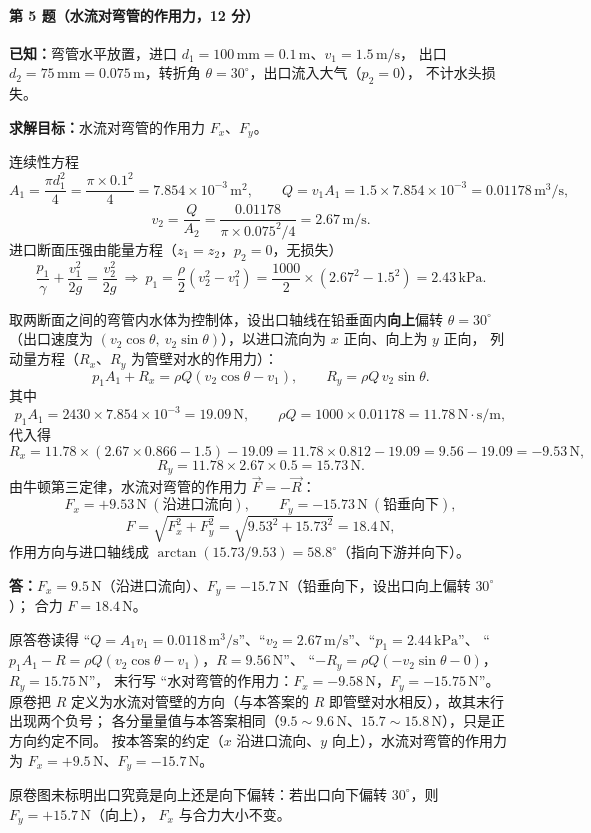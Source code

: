 \paragraph{第 5 题（水流对弯管的作用力，12 分）}
\begin{jie}
\textbf{已知：}弯管水平放置，进口 $d_1=100\,\mathrm{mm}=0.1\,\mathrm{m}$、$v_1=1.5\,\mathrm{m/s}$，
出口 $d_2=75\,\mathrm{mm}=0.075\,\mathrm{m}$，转折角 $\theta=30^{\circ}$，出口流入大气（$p_2=0$），
不计水头损失。

\textbf{求解目标：}水流对弯管的作用力 $F_x$、$F_y$。

连续性方程
\[
A_1=\frac{\pi d_1^{2}}{4}=\frac{\pi\times0.1^{2}}{4}=7.854\times10^{-3}\,\mathrm{m^{2}},
\qquad
Q=v_1A_1=1.5\times7.854\times10^{-3}=0.01178\,\mathrm{m^{3}/s},
\]
\[
v_2=\frac{Q}{A_2}=\frac{0.01178}{\pi\times0.075^{2}/4}=2.67\,\mathrm{m/s}.
\]
进口断面压强由能量方程（$z_1=z_2$，$p_2=0$，无损失）
\[
\frac{p_1}{\gamma}+\frac{v_1^{2}}{2g}=\frac{v_2^{2}}{2g}
\ \Longrightarrow\
p_1=\frac{\rho}{2}\left(v_2^{2}-v_1^{2}\right)
=\frac{1000}{2}\times(2.67^{2}-1.5^{2})=2.43\,\mathrm{kPa}.
\]

取两断面之间的弯管内水体为控制体，设出口轴线在铅垂面内\textbf{向上}偏转 $\theta=30^{\circ}$
（出口速度为 $(v_2\cos\theta,\ v_2\sin\theta)$），以进口流向为 $x$ 正向、向上为 $y$ 正向，
列动量方程（$R_x$、$R_y$ 为管壁对水的作用力）：
\[
p_1A_1+R_x=\rho Q\left(v_2\cos\theta-v_1\right),
\qquad
R_y=\rho Q\,v_2\sin\theta .
\]
其中
\[
p_1A_1=2430\times7.854\times10^{-3}=19.09\,\mathrm{N},
\qquad
\rho Q=1000\times0.01178=11.78\,\mathrm{N\cdot s/m},
\]
代入得
\[
R_x=11.78\times(2.67\times0.866-1.5)-19.09
=11.78\times0.812-19.09=9.56-19.09=-9.53\,\mathrm{N},
\]
\[
R_y=11.78\times2.67\times0.5=15.73\,\mathrm{N}.
\]
由牛顿第三定律，水流对弯管的作用力 $\vec F=-\vec R$：
\[
F_x=+9.53\,\mathrm{N}\ (\text{沿进口流向}),\qquad
F_y=-15.73\,\mathrm{N}\ (\text{铅垂向下}),
\]
\[
F=\sqrt{F_x^{2}+F_y^{2}}=\sqrt{9.53^{2}+15.73^{2}}=18.4\,\mathrm{N},
\]
作用方向与进口轴线成 $\arctan(15.73/9.53)=58.8^{\circ}$（指向下游并向下）。

\textbf{答：}$F_x=9.5\,\mathrm{N}$（沿进口流向）、$F_y=-15.7\,\mathrm{N}$（铅垂向下，设出口向上偏转 $30^{\circ}$）；
合力 $F=18.4\,\mathrm{N}$。
\end{jie}

\begin{tishi}
原答卷读得 ``$Q=A_1v_1=0.0118\,\mathrm{m^{3}/s}$''、``$v_2=2.67\,\mathrm{m/s}$''、``$p_1=2.44\,\mathrm{kPa}$''、
``$p_1A_1-R=\rho Q(v_2\cos\theta-v_1)$，$R=9.56\,\mathrm{N}$''、
``$-R_y=\rho Q(-v_2\sin\theta-0)$，$R_y=15.75\,\mathrm{N}$''，
末行写 ``水对弯管的作用力：$F_x=-9.58\,\mathrm{N}$，$F_y=-15.75\,\mathrm{N}$''。
原卷把 $R$ 定义为水流对管壁的方向（与本答案的 $R$ 即管壁对水相反），故其末行出现两个负号；
各分量量值与本答案相同（$9.5\sim9.6\,\mathrm{N}$、$15.7\sim15.8\,\mathrm{N}$），只是正方向约定不同。
按本答案的约定（$x$ 沿进口流向、$y$ 向上），水流对弯管的作用力为 $F_x=+9.5\,\mathrm{N}$、$F_y=-15.7\,\mathrm{N}$。

原卷图未标明出口究竟是向上还是向下偏转：若出口向下偏转 $30^{\circ}$，则 $F_y=+15.7\,\mathrm{N}$（向上），
$F_x$ 与合力大小不变。
\end{tishi}

